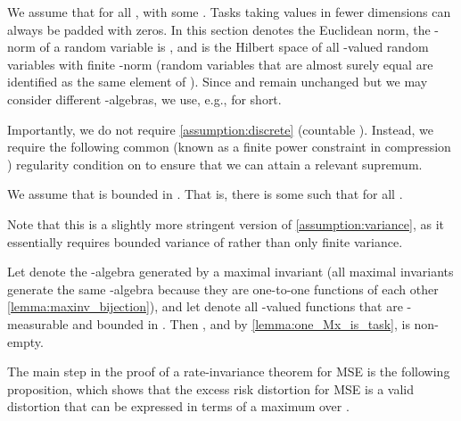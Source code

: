 \documentclass[final]{article}
\begin{document}
We assume that  for all , with some . Tasks taking values in fewer dimensions can always be padded with zeros. In this section  denotes the Euclidean norm, the -norm of a random variable  is , and  is the Hilbert space of all -valued random variables with finite -norm (random variables that are almost surely equal are identified as the same element of ). Since  and  remain unchanged but we may consider different -algebras, we use, e.g.,  for short.

Importantly, we do not require \cref{assumption:discrete} (countable ). 
Instead, we require the following common (known as a finite power constraint in compression \cite{cover_elements_2006}) regularity condition on  to ensure that we can attain a relevant supremum.

\begin{assumption}[-boundedness]\label{assumption:l2:bounded}
    We assume that  is bounded in . That is, there is some  such that  for all .
\end{assumption}

Note that this is a slightly more stringent version of \cref{assumption:variance}, as it essentially requires bounded variance of  rather than only finite variance.

Let  denote the -algebra generated by a maximal invariant (all maximal invariants generate the same -algebra because they are one-to-one functions of each other \cref{lemma:maxinv_bijection}), and let  denote all -valued functions that are -measurable and bounded in . Then , and by \cref{lemma:one_Mx_is_task},  is non-empty. 

The main step in the proof of a rate-invariance theorem for MSE is the following proposition, which shows that the excess risk distortion for MSE is a valid distortion that can be expressed in terms of a maximum over .
\end{document}
